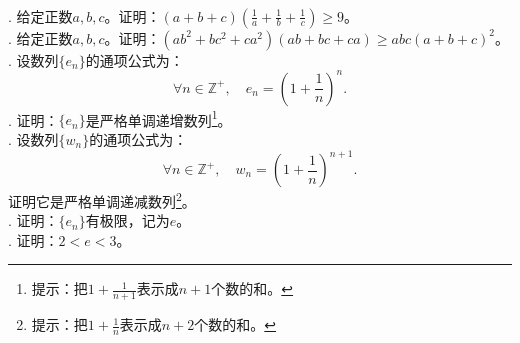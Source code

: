 \documentclass[12pt,UTF8,fontset=none]{ctexbook}
\begin{document}
\begin{xt}    
    \mbox{}\\
    . 给定正数$a,b,c$。证明：$(a + b + c)(\frac{1}{a}+\frac{1}{b}+\frac{1}{c}) \geqslant 9$。\\
    . 给定正数$a,b,c$。证明：$(ab^2 + bc^2 + ca^2)(ab + bc + ca) \geqslant abc(a+b+c)^2$。 \\
    . 设数列$\{e_n\}$的通项公式为：
    $$ \forall n\in\mathbb{Z}^+,\quad e_n = \left(1 + \frac{1}{n}\right)^n.$$
    . 证明：$\{e_n\}$是严格单调递增数列\footnote{提示：把$1 + \frac{1}{n+1}$表示成$n+1$个数的和。}。\\
    . 设数列$\{w_n\}$的通项公式为：
    $$ \forall n\in\mathbb{Z}^+,\quad w_n = \left(1 + \frac{1}{n}\right)^{n+1}.$$
    证明它是严格单调递减数列\footnote{提示：把$1 + \frac{1}{n}$表示成$n+2$个数的和。}。 \\
    . 证明：$\{e_n\}$有极限，记为$e$。\\
    . 证明：$2 < e < 3$。
\end{xt}
\end{document}
